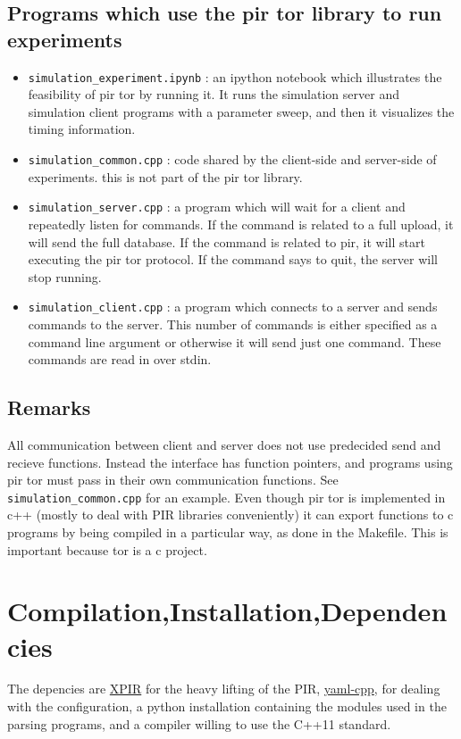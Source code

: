 \documentclass{article}
\begin{document}
\subsection{Programs which use the pir tor library to run experiments}
     \begin{itemize} 
        \item \texttt{simulation\_experiment.ipynb} : an ipython notebook which illustrates the feasibility of pir tor by running it. It runs the simulation server and simulation client programs with a parameter sweep, and then it visualizes the timing information.
        \item \texttt{simulation\_common.cpp} : code shared by the client-side and server-side of experiments. this is not part of the pir tor library.
        \item \texttt{simulation\_server.cpp} : a program which will wait for a client and repeatedly listen for commands. If the command is related to a full upload, it will send the full database. If the command is related to pir, it will start executing the pir tor protocol. If the command says to quit, the server will stop running.
        \item \texttt{simulation\_client.cpp} : a program which connects to a server and sends commands to the server. This number of commands is either specified as a command line argument or otherwise it will send just one command. These commands are read in over stdin.
     \end{itemize}

\subsection{Remarks}
        All communication between client and server does not use predecided send and recieve functions. Instead the interface has function pointers, and programs using pir tor must pass in their own communication functions. See \texttt{simulation\_common.cpp} for an example.
        Even though pir tor is implemented in c++ (mostly to deal with PIR libraries conveniently) it can export functions to c programs by being compiled in a particular way, as done in the Makefile. This is important because tor is a c project.

\section{Compilation,Installation,Dependencies}
    The depencies are \href{https://github.com/XPIR-team/XPIR/}{XPIR} for the heavy lifting of the PIR, \href{https://github.com/jbeder/yaml-cpp}{yaml-cpp}, for dealing with the configuration, a python installation containing the modules used in the parsing programs, and a compiler willing to use the C++11 standard.
\end{document}
